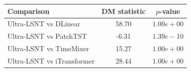 \begin{tabular}{lcc}
\toprule
Comparison & DM statistic & $p$-value \\
\midrule
Ultra-LSNT vs DLinear & 58.70 & $1.00e+00$ \\
Ultra-LSNT vs PatchTST & -6.31 & $1.39e-10$ \\
Ultra-LSNT vs TimeMixer & 15.27 & $1.00e+00$ \\
Ultra-LSNT vs iTransformer & 28.44 & $1.00e+00$ \\
\bottomrule
\end{tabular}
